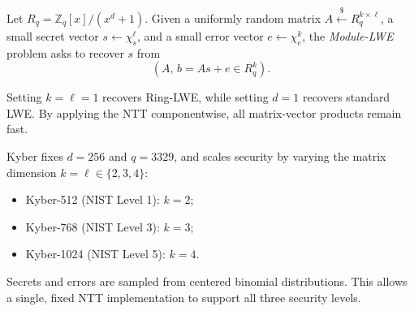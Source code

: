 \begin{definition}
    Let \(R_q = \mathbb{Z}_q[x] / (x^d + 1)\).
    Given a uniformly random matrix \(A \xleftarrow{\$} R_q^{k \times \ell}\), a small secret vector \(s \leftarrow \chi_s^\ell\), and a small error vector \(e \leftarrow \chi_e^k\), the \emph{Module-LWE} problem asks to recover \(s\) from
    \[
        (A, \, b = As + e \in R_q^k).
    \]
\end{definition}

Setting \(k = \ell = 1\) recovers Ring-LWE, while setting \(d = 1\) recovers standard LWE.
By applying the NTT componentwise, all matrix-vector products remain fast.

\begin{example}
    Kyber fixes \(d = 256\) and \(q = 3329\), and scales security by varying the matrix dimension \(k = \ell \in \{2, 3, 4\}\):
    \begin{itemize}
        \item Kyber-512 (NIST Level 1): \(k = 2\);
        \item Kyber-768 (NIST Level 3): \(k = 3\);
        \item Kyber-1024 (NIST Level 5): \(k = 4\).
    \end{itemize}
    Secrets and errors are sampled from centered binomial distributions.
    This allows a single, fixed NTT implementation to support all three security levels.
\end{example}